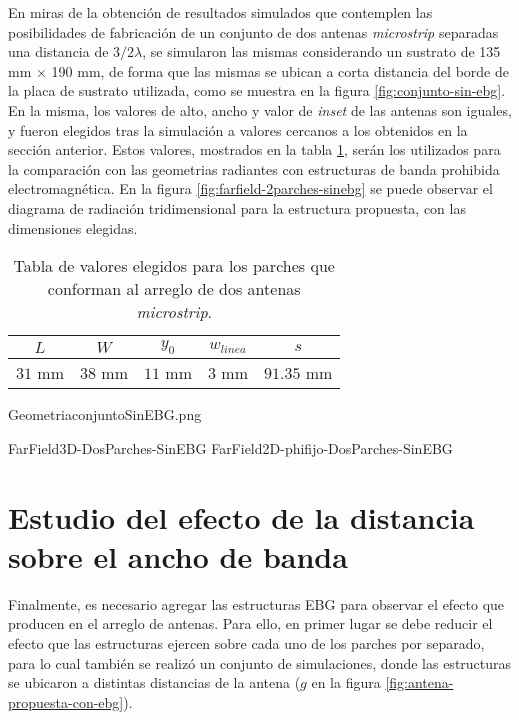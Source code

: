 En miras de la obtención de resultados simulados que contemplen las posibilidades de fabricación de un conjunto de dos antenas \textit{microstrip} separadas una distancia de $3/2 \lambda$, se simularon las mismas considerando un sustrato de 135 mm $\times$ 190 mm, de forma que las mismas se ubican a corta distancia del borde de la placa de sustrato utilizada, como se muestra en la figura \ref{fig:conjunto-sin-ebg}. En la misma, los valores de alto, ancho y valor de \textit{inset} de las antenas son iguales, y fueron elegidos tras la simulación a valores cercanos a los obtenidos en la sección anterior. Estos valores, mostrados en la tabla \ref{table:valores-dosparches-geometria}, serán los utilizados para la comparación con las geometrias radiantes con estructuras de banda prohibida electromagnética. En la figura \ref{fig:farfield-2parches-sinebg} se puede observar el diagrama de radiación tridimensional para la estructura propuesta, con las dimensiones elegidas.

\begin{table}
	\centering
	\begin{tabular}{c|c|c|c|c}
		$L$ & $W$ & $y_0$ & $w_{linea}$ & $s$ \\
		\hline
		$31$ mm & $38$ mm & $11$ mm & $3$ mm & $91.35$ mm
	\end{tabular}
	\caption{Tabla de valores elegidos para los parches que conforman al arreglo de dos antenas \textit{microstrip}.}
	\label{table:valores-dosparches-geometria}
\end{table}

GeometriaconjuntoSinEBG.png

FarField3D-DosParches-SinEBG
FarField2D-phifijo-DosParches-SinEBG





\section{Estudio del efecto de la distancia sobre el ancho de banda}
\label{sec_efecto_distancia}

Finalmente, es necesario agregar las estructuras EBG para observar el efecto que producen en el arreglo de antenas. Para ello, en primer lugar se debe reducir el efecto que las estructuras ejercen sobre cada uno de los parches por separado, para lo cual también se realizó un conjunto de simulaciones, donde las estructuras se ubicaron a distintas distancias de la antena ($g$ en la figura \ref{fig:antena-propuesta-con-ebg}).

